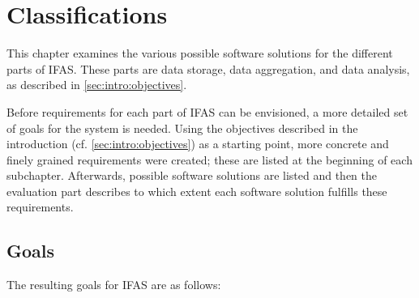 %
\chapter{Classifications}
\label{ch:classifications}

This chapter examines the various possible software solutions for the different parts of \acf{IFAS}.
These parts are data storage, data aggregation, and data analysis, as described in \cref{sec:intro:objectives}.

Before requirements for each part of \ac{IFAS} can be envisioned, a more detailed set of goals for the system is needed.
Using the objectives described in the introduction (cf. \cref{sec:intro:objectives}) as a starting point, more concrete and finely grained requirements were created; these are listed at the beginning of each subchapter.
Afterwards, possible software solutions are listed and then the evaluation part describes to which extent each software solution fulfills these requirements.

\section{Goals}
\label{sec:design:goals}

The resulting goals for \ac{IFAS} are as follows:

